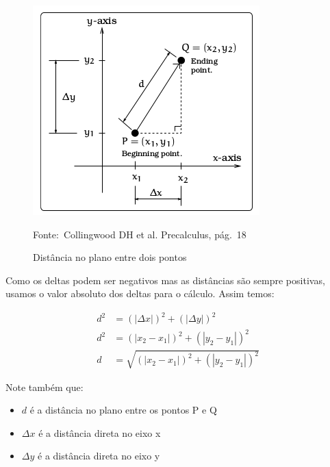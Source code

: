 \documentclass[pdftex, brazil, 12pt, twoside]{article}
\begin{document}
\begin{figure}[ht]
  \begin{center}
    \caption{Distância no plano entre dois pontos}
    \label{fig:distancia-plano}
    \includegraphics[scale=0.9]{imagens/distancia.png}
    
    \footnotesize{Fonte:~Collingwood DH et al. Precalculus, pág.\ 18}
  \end{center}
\end{figure}

Como os deltas podem ser negativos mas as distâncias são sempre positivas, usamos
o valor absoluto dos deltas para o cálculo. Assim temos:

\begin{equation}
  \begin{split}
    d^2 & = (|\Delta x|)^2 + (|\Delta y|)^2\\
    d^2 & = (|x_2 - x_1|)^2 + (|y_2 - y_1|)^2\\
      d & = \sqrt{(|x_2 - x_1|)^2 + (|y_2 - y_1|)^2}
  \end{split}
\end{equation}

Note também que:

\begin{itemize}[noitemsep]
\item $d$ é a distância no plano entre os pontos P e Q
\item $\Delta x$ é a distância direta no eixo x
\item $\Delta y$ é a distância direta no eixo y
\end{itemize}


\end{document}
